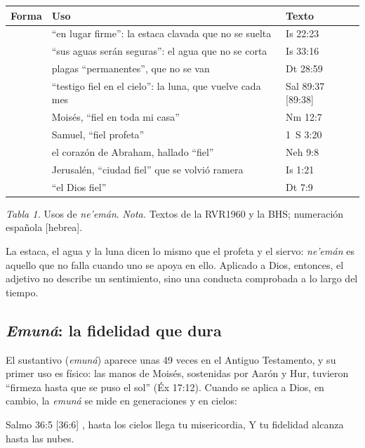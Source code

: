 \begin{center}\small\renewcommand{\arraystretch}{1.18}
\begin{tabular}{@{}L{3.6cm}L{7.2cm}L{3.4cm}@{}}
\toprule
\textbf{Forma} & \textbf{Uso} & \textbf{Texto} \\ \midrule
{} & ``en lugar firme'': la estaca clavada que no se suelta & Is 22:23 \\
 & ``sus aguas serán seguras'': el agua que no se corta & Is 33:16 \\
 & plagas ``permanentes'', que no se van & Dt 28:59 \\
 & ``testigo fiel en el cielo'': la luna, que vuelve cada mes & Sal 89:37 [89:38] \\
 & Moisés, ``fiel en toda mi casa'' & Nm 12:7 \\
 & Samuel, ``fiel profeta'' & 1~S 3:20 \\
 & el corazón de Abraham, hallado ``fiel'' & Neh 9:8 \\
 & Jerusalén, ``ciudad fiel'' que se volvió ramera & Is 1:21 \\
 & ``el Dios fiel'' & Dt 7:9 \\
\bottomrule
\end{tabular}\par
{\footnotesize\color{gris}\textit{Tabla 1.} Usos de \emph{ne'emán}. \textit{Nota.} Textos de la RVR1960 y la BHS; numeración española [hebrea].}
\end{center}

La estaca, el agua y la luna dicen lo mismo que el profeta y el siervo: \emph{ne'emán} es aquello que no falla cuando uno se apoya en ello. Aplicado a Dios, entonces, el adjetivo no describe un sentimiento, sino una conducta comprobada a lo largo del tiempo.

\subsection{\emph{Emuná}: la fidelidad que dura}
El sustantivo  (\emph{emuná}) aparece unas 49 veces en el Antiguo Testamento, y su primer uso es físico: las manos de Moisés, sostenidas por Aarón y Hur, tuvieron ``firmeza hasta que se puso el sol'' (Éx 17:12). Cuando se aplica a Dios, en cambio, la \emph{emuná} se mide en generaciones y en cielos:

\begin{verso}{Salmo 36:5 [36:6]}
\SENOR{}, hasta los cielos llega tu misericordia, Y tu fidelidad alcanza hasta las nubes.
\end{verso}

